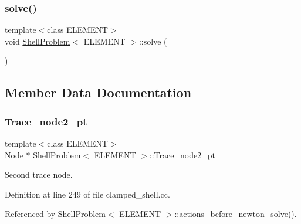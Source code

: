 \mbox{\label{classShellProblem_aa6d150bd1c137edbf4ded27ed044766d}} 
\subsubsection{\texorpdfstring{solve()}{solve()}\hspace{0.1cm}{\footnotesize\ttfamily [2/2]}}
{\footnotesize\ttfamily template$<$class E\+L\+E\+M\+E\+NT$>$ \\
void \hyperlink{classShellProblem}{Shell\+Problem}$<$ E\+L\+E\+M\+E\+NT $>$\+::solve (\begin{DoxyParamCaption}{ }\end{DoxyParamCaption})}



\subsection{Member Data Documentation}
\mbox{\label{classShellProblem_a1933abc1b3e5637e23fa2809eb1cd88f}} 
\subsubsection{\texorpdfstring{Trace\+\_\+node2\+\_\+pt}{Trace\_node2\_pt}}
{\footnotesize\ttfamily template$<$class E\+L\+E\+M\+E\+NT$>$ \\
Node $\ast$ \hyperlink{classShellProblem}{Shell\+Problem}$<$ E\+L\+E\+M\+E\+NT $>$\+::Trace\+\_\+node2\+\_\+pt\hspace{0.3cm}{\ttfamily [private]}}



Second trace node. 



Definition at line 249 of file clamped\+\_\+shell.\+cc.



Referenced by Shell\+Problem$<$ E\+L\+E\+M\+E\+N\+T $>$\+::actions\+\_\+before\+\_\+newton\+\_\+solve().

\mbox{\label{classShellProblem_a45230216c4791c683218ff6d7f4ba9a0}} 
